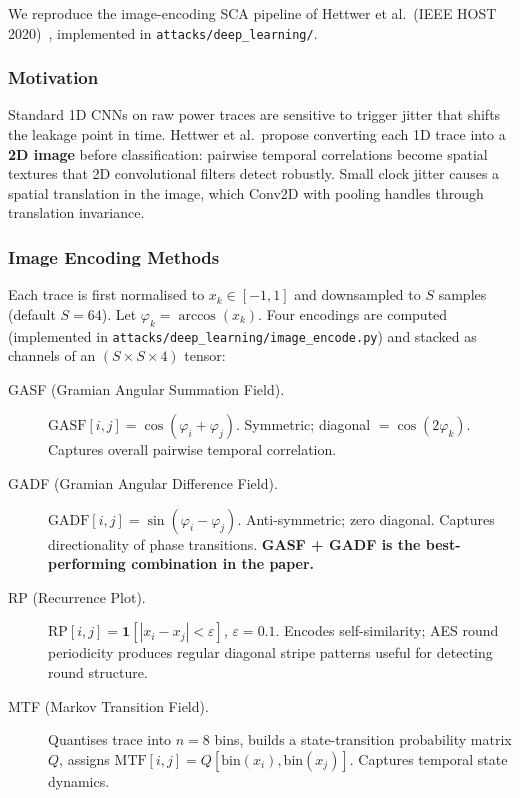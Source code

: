 We reproduce the image-encoding SCA pipeline of Hettwer et al.\
(IEEE HOST 2020)~\cite{hettwer2020encoding}, implemented in
\texttt{attacks/deep\_learning/}.

\subsubsection{Motivation}

Standard 1D CNNs on raw power traces are sensitive to trigger jitter
that shifts the leakage point in time.
Hettwer et al.\ propose converting each 1D trace into a \textbf{2D image}
before classification: pairwise temporal correlations become spatial
textures that 2D convolutional filters detect robustly.
Small clock jitter causes a spatial translation in the image, which
Conv2D with pooling handles through translation invariance.

\subsubsection{Image Encoding Methods}

Each trace is first normalised to $x_k \in [-1,1]$ and downsampled to
$S$ samples (default $S=64$).
Let $\varphi_k = \arccos(x_k)$.
Four encodings are computed (implemented in
\texttt{attacks/deep\_learning/image\_encode.py}) and stacked as channels
of an $(S \times S \times 4)$ tensor:

\begin{description}
  \item[GASF (Gramian Angular Summation Field).]
    $\mathrm{GASF}[i,j] = \cos(\varphi_i + \varphi_j)$.
    Symmetric; diagonal $= \cos(2\varphi_k)$.
    Captures overall pairwise temporal correlation.

  \item[GADF (Gramian Angular Difference Field).]
    $\mathrm{GADF}[i,j] = \sin(\varphi_i - \varphi_j)$.
    Anti-symmetric; zero diagonal.
    Captures directionality of phase transitions.
    \textbf{GASF + GADF is the best-performing combination in the paper.}

  \item[RP (Recurrence Plot).]
    $\mathrm{RP}[i,j] = \mathbf{1}[|x_i - x_j| < \varepsilon]$,
    $\varepsilon = 0.1$.
    Encodes self-similarity; AES round periodicity produces regular
    diagonal stripe patterns useful for detecting round structure.

  \item[MTF (Markov Transition Field).]
    Quantises trace into $n=8$ bins, builds a state-transition probability
    matrix $Q$, assigns $\mathrm{MTF}[i,j] = Q[\mathrm{bin}(x_i),
    \mathrm{bin}(x_j)]$.
    Captures temporal state dynamics.
\end{description}

